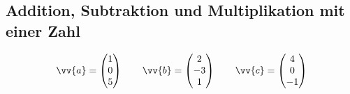 \subsection{Addition, Subtraktion und Multiplikation mit einer Zahl}
\begin{gather*}
  \vv{a} = \begin{pmatrix}1 \\ 0 \\ 5\end{pmatrix} \qquad \vv{b} = \begin{pmatrix}2 \\ -3 \\ 1\end{pmatrix} \qquad \vv{c} = \begin{pmatrix}4 \\ 0 \\ -1\end{pmatrix}
\end{gather*}
